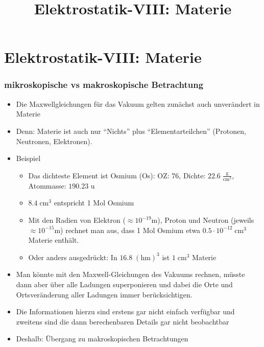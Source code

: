

\title[TET: Elektrostatik-VIII: Materie]{Elektrostatik-VIII: Materie}


% 
% 

\maketitle

% 
% 
\section{Elektrostatik-VIII: Materie}

\begin{frame}

  \frametitle{mikroskopische vs makroskopische Betrachtung}
  \begin{itemize}[<+->]
  \item Die Maxwellgleichungen für das Vakuum gelten zunächst auch \alert{unverändert} in Materie
  \item Denn: Materie ist auch nur \enquote{Nichts} plus \enquote{Elementarteilchen} (Protonen, Neutronen, Elektronen).
  \item Beispiel
      \begin{itemize}[<+->]
      \item Das dichteste Element ist \alert{Osmium} (Os): OZ: 76, Dichte: $22.6\; \frac{\text{g}}{\text{cm}^3}$, Atommasse: $190.23$ u
      \item $8.4\; \text{cm}^3$ entspricht 1 Mol Osmium
      \item Mit den Radien von Elektron ($\approx 10^{-19}$\;m), Proton und Neutron (jeweils $\approx 10^{-15}$\;m) rechnet man aus, dass 1 Mol Osmium etwa $0.5\cdot 10^{-12}\;\text{cm}^3$ Materie enthält.
        \item Oder anders ausgedrückt: In $16.8\;(\text{hm})^3$ ist $1\;\text{cm}^3$ Materie
        \end{itemize}
      \item Man könnte mit den Maxwell-Gleichungen des Vakuums rechnen, müsste dann aber über alle Ladungen superponieren und dabei die Orte und Ortsveränderung aller Ladungen immer berücksichtigen.
      \item Die Informationen hierzu sind erstens gar nicht einfach verfügbar und zweitens sind die dann berechenbaren Details gar nicht beobachtbar
        \item Deshalb: Übergang zu \alert{makroskopischen Betrachtungen}
  \end{itemize}
  
  \end{frame}

